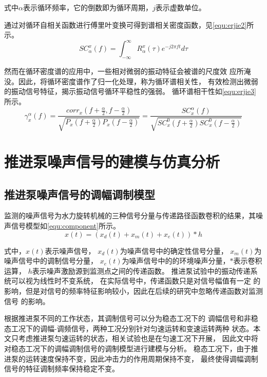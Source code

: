 式中$\alpha$表示循环频率，它的倒数即为循环周期，$j$表示虚数单位。

通过对循环自相关函数进行傅里叶变换可得到谱相关密度函数，见\autoref{equ:erjie2}所示。
\begin{equation}
    \label{equ:erjie2}
    SC_{\alpha }^{x} \left ( f  \right ) =\int_{-\infty }^{\infty } R_{\alpha }^{x}\left ( \tau  \right )  e^{-j2\pi f t} d\tau   
\end{equation}

然而在循环密度谱的应用中，一些相对微弱的振动特征会被谱的尺度效
应所淹没。因此，将循环密度谱作了归一化处理，称为循环谱相关性，
有效检测出微弱的振动信号特征，揭示振动信号循环平稳性的强弱\cite{li2018}。
循环谱相干性如\autoref{equ:erjie3}所示。
\begin{equation}
    \label{equ:erjie3}
    \gamma _{x}^{\alpha}\left ( f \right ) =\frac{corr_{x}\left ( f+\frac{\alpha }{2}, f-\frac{\alpha }{2} \right )  }{\sqrt{P_{x}\left ( f+\frac{\alpha }{2} \right )P_{x}\left ( f-\frac{\alpha }{2} \right ) } } =\frac{SC_{x}^{\alpha }\left ( f \right )  }{\sqrt{SC_{x}^{0} \left ( f+\frac{\alpha }{2} \right )SC_{x}^{0} \left ( f-\frac{\alpha }{2} \right )} }  
\end{equation}

\section{推进泵噪声信号的建模与仿真分析}
\subsection{推进泵噪声信号的调幅调制模型}
监测的噪声信号为水力旋转机械的三种信号分量与传递路径函数卷积的结果，其噪声信号模型如\autoref{equ:component}所示。 
\begin{equation}
    \label{equ:component}
    x\left ( t \right ) =\left ( x_d\left ( t \right )+x_m\left ( t \right )+x_e\left ( t \right ) \right )\ast h 
\end{equation}

式中，$x\left ( t \right )$表示噪声信号，
$x_d\left ( t \right )$为噪声信号中的确定性信号分量，
$x_m\left ( t \right )$为噪声信号中的调制信号分量，
$x_e\left ( t \right )$为噪声信号中的的环境噪声分量，$\ast$表示卷积运算，
$h$表示噪声激励源到监测点之间的传递函数。 
推进泵试验中的振动传递系统可以视为线性时不变系统，
在实际信号中，传递函数只是对信号幅值有一定
的影响，但是对信号的频率特征影响较小，因此在后续的研究中忽略传递函数对监测信号
的影响\cite{song2019}。 

根据推进泵不同的工作状态，其调制信号可以分为稳态工况下的
调幅信号和非稳态工况下的调幅-调频信号，两种工况分别针对匀速运转和变速运转两种
状态。本文只考虑推进泵匀速运转的状态，相关试验也是在匀速工况下开展，
因此文中将对稳态工况下的调幅调制信号的调制模型进行建模与分析。 
稳态工况下，由于推进泵的运转速度保持不变，因此冲击力的作用周期保持不变，
最终使得调幅调制信号的特征调制频率保持稳定不变。

